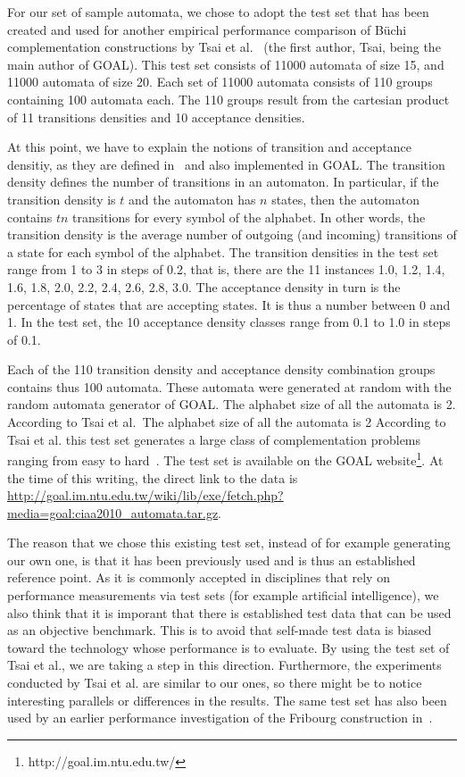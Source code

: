 For our set of sample automata, we chose to adopt the test set that has been created and used for another empirical performance comparison of Büchi complementation constructions by Tsai et al.~\cite{2010_tsai} (the first author, Tsai, being the main author of GOAL). This test set consists of 11000 automata of size 15, and 11000 automata of size 20. Each set of 11000 automata consists of 110 groups containing 100 automata each. The 110 groups result from the cartesian product of 11 transitions densities and 10 acceptance densities.

At this point, we have to explain the notions of transition and acceptance densitiy, as they are defined in~\cite{2010_tsai} and also implemented in GOAL. The transition density defines the number of transitions in an automaton. In particular, if the transition density is $t$ and the automaton has $n$ states, then the automaton contains $tn$ transitions for every symbol of the alphabet. In other words, the transition density is the average number of outgoing (and incoming) transitions of a state for each symbol of the alphabet. The transition densities in the test set range from 1 to 3 in steps of 0.2, that is, there are the 11 instances 1.0, 1.2, 1.4, 1.6, 1.8, 2.0, 2.2, 2.4, 2.6, 2.8, 3.0. The acceptance density in turn is the percentage of states that are accepting states. It is thus a number between 0 and 1. In the test set, the 10 acceptance density classes range from 0.1 to 1.0 in steps of 0.1.

Each of the 110 transition density and acceptance density combination groups contains thus 100 automata. These automata were generated at random with the random automata generator of GOAL. The alphabet size of all the automata is 2. According to Tsai et al.~The alphabet size of all the automata is 2 According to Tsai et al. this test set generates a large class of complementation problems ranging from easy to hard~\cite{2010_tsai}. The test set is available on the GOAL website\footnote{http://goal.im.ntu.edu.tw/}. At the time of this writing, the direct link to the data is \url{http://goal.im.ntu.edu.tw/wiki/lib/exe/fetch.php?media=goal:ciaa2010_automata.tar.gz}.

The reason that we chose this existing test set, instead of for example generating our own one, is that it has been previously used and is thus an established reference point. As it is commonly accepted in disciplines that rely on performance measurements via test sets (for example artificial intelligence), we also think that it is imporant that there is established test data that can be used as an objective benchmark. This is to avoid that self-made test data is biased toward the technology whose performance is to evaluate. By using the test set of Tsai et al., we are taking a step in this direction. Furthermore, the experiments conducted by Tsai et al. are similar to our ones, so there might be to notice interesting parallels or differences in the results. The same test set has also been used by an earlier performance investigation of the Fribourg construction in~\cite{2013_bsc_goettel}.

